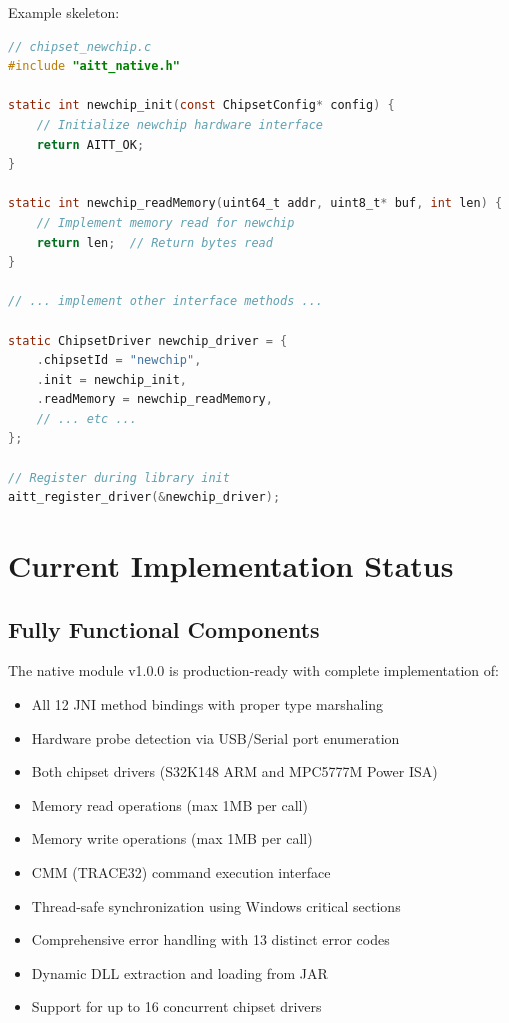 \documentclass[12pt,a4paper]{article}
\begin{document}
Example skeleton:

\begin{lstlisting}[language=C, caption=Skeleton for New Chipset Driver]
// chipset_newchip.c
#include "aitt_native.h"

static int newchip_init(const ChipsetConfig* config) {
    // Initialize newchip hardware interface
    return AITT_OK;
}

static int newchip_readMemory(uint64_t addr, uint8_t* buf, int len) {
    // Implement memory read for newchip
    return len;  // Return bytes read
}

// ... implement other interface methods ...

static ChipsetDriver newchip_driver = {
    .chipsetId = "newchip",
    .init = newchip_init,
    .readMemory = newchip_readMemory,
    // ... etc ...
};

// Register during library init
aitt_register_driver(&newchip_driver);
\end{lstlisting}

\newpage

\section{Current Implementation Status}

\subsection{Fully Functional Components}

The native module v1.0.0 is production-ready with complete implementation of:

\begin{itemize}
    \item[\checkmark] All 12 JNI method bindings with proper type marshaling
    \item[\checkmark] Hardware probe detection via USB/Serial port enumeration
    \item[\checkmark] Both chipset drivers (S32K148 ARM and MPC5777M Power ISA)
    \item[\checkmark] Memory read operations (max 1MB per call)
    \item[\checkmark] Memory write operations (max 1MB per call)
    \item[\checkmark] CMM (TRACE32) command execution interface
    \item[\checkmark] Thread-safe synchronization using Windows critical sections
    \item[\checkmark] Comprehensive error handling with 13 distinct error codes
    \item[\checkmark] Dynamic DLL extraction and loading from JAR
    \item[\checkmark] Support for up to 16 concurrent chipset drivers
\end{itemize}
\end{document}
